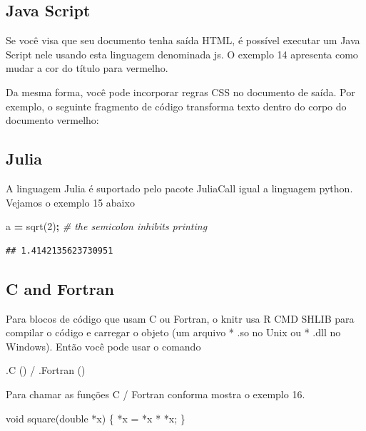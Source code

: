 \documentclass[
]{book}
\newenvironment{Shaded}{\begin{snugshade}}{\end{snugshade}}
\newcommand{\CommentTok}[1]{\textcolor[rgb]{0.56,0.35,0.01}{\textit{#1}}}
\newcommand{\DataTypeTok}[1]{\textcolor[rgb]{0.13,0.29,0.53}{#1}}
\newcommand{\FloatTok}[1]{\textcolor[rgb]{0.00,0.00,0.81}{#1}}
\newcommand{\NormalTok}[1]{#1}
\newcommand{\OperatorTok}[1]{\textcolor[rgb]{0.81,0.36,0.00}{\textbf{#1}}}
\begin{document}
\hypertarget{java-script}{%
\subsection{Java Script}\label{java-script}}

Se você visa que seu documento tenha saída HTML, é possível executar um Java Script nele usando esta linguagem denominada js.
O exemplo 14 apresenta como mudar a cor do título para vermelho.

Da mesma forma, você pode incorporar regras CSS no documento de saída. Por exemplo, o seguinte fragmento de código transforma
texto dentro do corpo do documento vermelho:

\hypertarget{julia}{%
\subsection{Julia}\label{julia}}

A linguagem Julia é suportado pelo pacote JuliaCall igual a linguagem python. Vejamos o exemplo 15 abaixo

\begin{Shaded}
\begin{Highlighting}[]
\NormalTok{a }\OperatorTok{=}\NormalTok{ sqrt(}\FloatTok{2}\NormalTok{)}\OperatorTok{;} \CommentTok{\# the semicolon inhibits printing}
\end{Highlighting}
\end{Shaded}

\begin{verbatim}
## 1.4142135623730951
\end{verbatim}

\hypertarget{c-and-fortran}{%
\subsection{C and Fortran}\label{c-and-fortran}}

Para blocos de código que usam C ou Fortran, o knitr usa R CMD SHLIB para compilar o código e carregar o objeto (um arquivo * .so no Unix ou * .dll no Windows). Então você pode usar o comando

.C () / .Fortran ()

Para chamar as funções C / Fortran conforma mostra o exemplo 16.

\begin{Shaded}
\begin{Highlighting}[]
\DataTypeTok{void}\NormalTok{ square(}\DataTypeTok{double}\NormalTok{ *x) \{}
\NormalTok{*x = *x * *x;}
\NormalTok{\}}
\end{Highlighting}
\end{Shaded}
\end{document}
